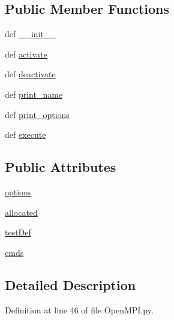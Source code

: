 \subsection*{Public Member Functions}
\begin{DoxyCompactItemize}
\item 
def \hyperlink{class_open_m_p_i_1_1_open_m_p_i_a98c85be81f92e692e8087d08c45ebd09}{\-\_\-\-\_\-init\-\_\-\-\_\-}
\item 
def \hyperlink{class_open_m_p_i_1_1_open_m_p_i_a446b9a62139dfc9065f4cc21450ed7f9}{activate}
\item 
def \hyperlink{class_open_m_p_i_1_1_open_m_p_i_ae235afe3cd4dfc210b7e8d045a108e5b}{deactivate}
\item 
def \hyperlink{class_open_m_p_i_1_1_open_m_p_i_a3b39e0c05069fd14533b0a528ac58001}{print\-\_\-name}
\item 
def \hyperlink{class_open_m_p_i_1_1_open_m_p_i_a6a912a2ac2d80ba6ac2d6595aa661268}{print\-\_\-options}
\item 
def \hyperlink{class_open_m_p_i_1_1_open_m_p_i_a4339bc2f6d52dce9bdd0818e7ce686d2}{execute}
\end{DoxyCompactItemize}
\subsection*{Public Attributes}
\begin{DoxyCompactItemize}
\item 
\hyperlink{class_open_m_p_i_1_1_open_m_p_i_a4a263774614f0b83a63a26639b46b2f5}{options}
\item 
\hyperlink{class_open_m_p_i_1_1_open_m_p_i_a9ffab4795264fde34d136269026204db}{allocated}
\item 
\hyperlink{class_open_m_p_i_1_1_open_m_p_i_acd20b78013350c2363484589ef85b67c}{test\-Def}
\item 
\hyperlink{class_open_m_p_i_1_1_open_m_p_i_a86be93bbc775c81263813274a8564efc}{cmds}
\end{DoxyCompactItemize}


\subsection{Detailed Description}


Definition at line 46 of file Open\-M\-P\-I.\-py.



